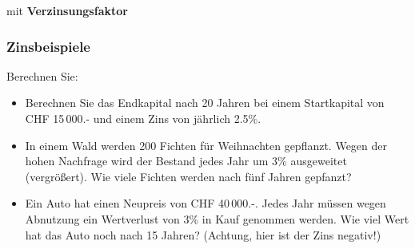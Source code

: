 \begin{center}\end{center}

mit \textbf{Verzinsungsfaktor}

\begin{center}\end{center}


\newpage

\subsubsection{Zinsbeispiele}

Berechnen Sie:

\begin{itemize}
  \item Berechnen Sie das Endkapital nach 20 Jahren bei einem
  Startkapital von CHF 15\,000.- und einem Zins von jährlich
  2.5\%.\\%

\item In einem Wald werden 200 Fichten für Weihnachten
  gepflanzt. Wegen der hohen Nachfrage wird der Bestand jedes Jahr um
  3\% ausgeweitet (vergrößert).
  Wie viele Fichten werden nach fünf Jahren gepfanzt?


\item Ein Auto hat einen Neupreis von CHF 40\,000.-. Jedes Jahr müssen wegen Abnutzung ein Wertverlust von 3\% in Kauf
  genommen werden. Wie viel Wert hat das Auto noch nach 15 Jahren? (Achtung, hier ist der Zins negativ!)

\end{itemize}
\newpage



